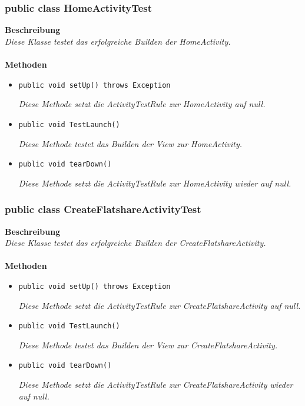 \documentclass[a4paper]{scrreprt}
\begin{document}
	\subsubsection{public class HomeActivityTest}
	\textbf{Beschreibung}\\
	\textit{Diese Klasse testet das erfolgreiche Builden der HomeActivity.}\\
	\\	
	\textbf{Methoden}
	\begin{itemize}
		
		\item\texttt{{public void setUp() throws Exception}}
		
		\textit{Diese Methode setzt die ActivityTestRule zur HomeActivity auf null.}
		
		\item\texttt{{public void TestLaunch()}}
		
		\textit{Diese Methode testet das Builden der View zur HomeActivity.}
		
		\item\texttt{{public void tearDown()}}
		
		\textit{Diese Methode setzt die ActivityTestRule zur HomeActivity wieder auf null.}
		
		
	\end{itemize}
	\subsubsection{public class CreateFlatshareActivityTest}
	\textbf{Beschreibung}\\
	\textit{Diese Klasse testet das erfolgreiche Builden der CreateFlatshareActivity.}\\
	\\	
	\textbf{Methoden}
	\begin{itemize}
		
		\item\texttt{{public void setUp() throws Exception}}
		
		\textit{Diese Methode setzt die ActivityTestRule zur CreateFlatshareActivity auf null.}
		
		\item\texttt{{public void TestLaunch()}}
		
		\textit{Diese Methode testet das Builden der View zur CreateFlatshareActivity.}
		
		\item\texttt{{public void tearDown()}}
		
		\textit{Diese Methode setzt die ActivityTestRule zur CreateFlatshareActivity wieder auf null.}
		
		
	\end{itemize}
\end{document}
